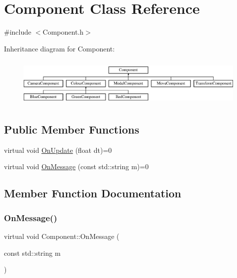 \hypertarget{class_component}{}\section{Component Class Reference}
\label{class_component}


{\ttfamily \#include $<$Component.\+h$>$}

Inheritance diagram for Component\+:\begin{figure}[H]
\begin{center}
\leavevmode
\includegraphics[height=2.400000cm]{class_component}
\end{center}
\end{figure}
\subsection*{Public Member Functions}
\begin{DoxyCompactItemize}
\item 
virtual void \mbox{\hyperlink{class_component_ab71d7f4b6d8792287a9b0c9e045acbe0}{On\+Update}} (float dt)=0
\item 
virtual void \mbox{\hyperlink{class_component_a1a880fe5e212cd7ef8241e220660417d}{On\+Message}} (const std\+::string m)=0
\end{DoxyCompactItemize}


\subsection{Member Function Documentation}
\mbox{\label{class_component_a1a880fe5e212cd7ef8241e220660417d}} 
\subsubsection{\texorpdfstring{On\+Message()}{OnMessage()}}
{\footnotesize\ttfamily virtual void Component\+::\+On\+Message (\begin{DoxyParamCaption}\item[{const std\+::string}]{m }\end{DoxyParamCaption})\hspace{0.3cm}{\ttfamily [pure virtual]}}

